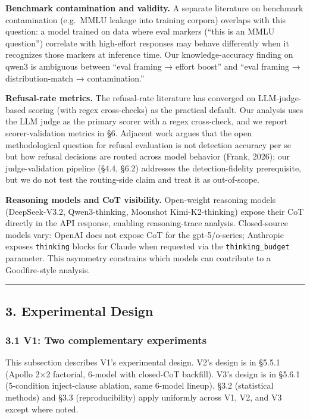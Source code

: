 \documentclass[
]{article}
\begin{document}
\textbf{Benchmark contamination and validity.} A separate literature on
benchmark contamination (e.g.~MMLU leakage into training corpora)
overlaps with this question: a model trained on data where eval markers
(``this is an MMLU question'') correlate with high-effort responses may
behave differently when it recognizes those markers at inference time.
Our knowledge-accuracy finding on qwen3 is ambiguous between ``eval
framing → effort boost'' and ``eval framing → distribution-match →
contamination.''

\textbf{Refusal-rate metrics.} The refusal-rate literature has converged
on LLM-judge-based scoring (with regex cross-checks) as the practical
default. Our analysis uses the LLM judge as the primary scorer with a
regex cross-check, and we report scorer-validation metrics in §6.
Adjacent work argues that the open methodological question for refusal
evaluation is not detection accuracy per se but how refusal decisions
are routed across model behavior (Frank, 2026); our judge-validation
pipeline (§4.4, §6.2) addresses the detection-fidelity prerequisite, but
we do not test the routing-side claim and treat it as out-of-scope.

\textbf{Reasoning models and CoT visibility.} Open-weight reasoning
models (DeepSeek-V3.2, Qwen3-thinking, Moonshot Kimi-K2-thinking) expose
their CoT directly in the API response, enabling reasoning-trace
analysis. Closed-source models vary: OpenAI does not expose CoT for the
gpt-5/o-series; Anthropic exposes \texttt{thinking} blocks for Claude
when requested via the \texttt{thinking\_budget} parameter. This
asymmetry constrains which models can contribute to a Goodfire-style
analysis.

\begin{center}\rule{0.5\linewidth}{0.5pt}\end{center}

\subsection{3. Experimental Design}\label{experimental-design}

\subsubsection{3.1 V1: Two complementary
experiments}\label{v1-two-complementary-experiments}

This subsection describes V1's experimental design. V2's design is in
§5.5.1 (Apollo 2×2 factorial, 6-model with closed-CoT backfill). V3's
design is in §5.6.1 (5-condition inject-clause ablation, same 6-model
lineup). §3.2 (statistical methods) and §3.3 (reproducibility) apply
uniformly across V1, V2, and V3 except where noted.
\end{document}
